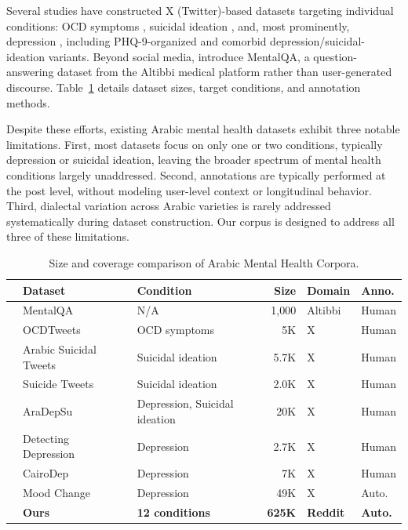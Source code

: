 \documentclass[letterpaper]{article} %
\begin{document}
Several studies have constructed X (Twitter)-based datasets targeting individual conditions: OCD symptoms \citep{al2024classification}, suicidal ideation \citep{abdulsalam2024detecting, baghdadi2022optimized}, and, most prominently, depression \citep{hassib2022aradepsu, almouzini2019detecting, elramly2021cairodep, maghraby2022mood}, including PHQ-9-organized \citep{maghraby2022mood} and comorbid depression/suicidal-ideation \citep{hassib2022aradepsu} variants. Beyond social media, \citet{alhuzali2024mentalqa} introduce MentalQA, a question-answering dataset from the Altibbi medical platform rather than user-generated discourse. Table~\ref{tab:arabic_datasets} details dataset sizes, target conditions, and annotation methods.

Despite these efforts, existing Arabic mental health datasets exhibit three
notable limitations. First, most datasets focus on only one or two conditions,
typically depression or suicidal ideation, leaving the broader spectrum of mental
health conditions largely unaddressed. Second, annotations are typically performed
at the post level, without modeling user-level context or longitudinal behavior.
Third, dialectal variation across Arabic varieties is rarely addressed
systematically during dataset construction. Our corpus is designed to address
all three of these limitations.

\begin{table}
\centering
\small
\begin{tabular}{cl l rll}
\toprule
& \textbf{Dataset} & \textbf{Condition} & \textbf{Size} & \textbf{Domain} & \textbf{Anno.} \\
\midrule
& MentalQA~\cite{alhuzali2024mentalqa} & N/A & 1,000 & Altibbi & Human \\
& OCDTweets~\cite{al2024classification} & OCD symptoms & 5K & X & Human \\
& Arabic Suicidal Tweets~\cite{abdulsalam2024detecting} & Suicidal ideation & 5.7K & X & Human \\
& Suicide Tweets~\cite{baghdadi2022optimized} & Suicidal ideation & 2.0K & X & Human \\
& AraDepSu~\cite{hassib2022aradepsu} & Depression, Suicidal ideation & 20K & X & Human \\
& Detecting Depression~\cite{almouzini2019detecting} & Depression & 2.7K & X & Human \\
& CairoDep~\cite{elramly2021cairodep} & Depression & 7K & X & Human \\
& Mood Change~\cite{maghraby2022mood} & Depression & 49K & X & Auto. \\
\midrule
& \textbf{Ours} & \textbf{12 conditions} & \textbf{625K} & \textbf{Reddit} & \textbf{Auto.} \\

\bottomrule
\end{tabular}
\caption{Size and coverage comparison of Arabic Mental Health Corpora.}

\label{tab:arabic_datasets}
\end{table}
\end{document}
